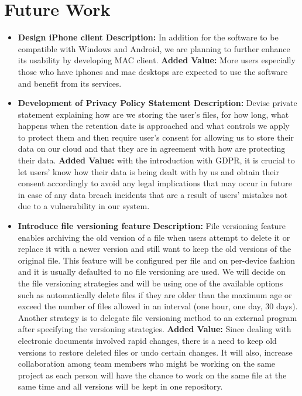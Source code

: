 \documentclass{article}
\begin{document}
\section{Future Work}
\begin{itemize}

\item \textbf{Design iPhone client}
\textbf{Description:} In addition for the software to be compatible with Windows and Android, we are planning to further enhance its usability by developing MAC client.
\textbf{Added Value:} More users especially those who have iphones and mac desktops are expected to use the software and benefit from its services.

\item \textbf{Development of Privacy Policy Statement}
\textbf{Description:} Devise private statement explaining how are we storing the user’s files, for how long, what happens when the retention date is approached and what controls we apply to protect them and then require user’s consent for allowing us to store their data on our cloud and that they are in agreement with how are protecting their data.
\textbf{Added Value:} with the introduction with GDPR, it is crucial to let users’ know how their data is being dealt with by us and obtain their consent accordingly to avoid any legal implications that may occur in future in case of any data breach incidents that are a result of users’ mistakes not due to a vulnerability in our system.


\item \textbf{Introduce file versioning feature}
\textbf{Description:} File versioning feature enables archiving the old version of a file when users attempt to delete it or replace it with a newer version and still want to keep the old versions of the original file. This feature will be configured per file and on per-device fashion and it is usually defaulted to no file versioning are used.
We will decide on the file versioning strategies and will be using one of the available options such as automatically delete files if they are older than the maximum age or exceed the number of files allowed in an interval (one hour, one day, 30 days). Another strategy is to delegate file versioning method to an external program after specifying the versioning strategies.
\textbf{Added Value:} Since dealing with electronic documents involved rapid changes, there is a need to keep old versions to restore deleted files or undo certain changes. It will also, increase collaboration among team members who might be working on the same project as each person will have the chance to work on the same file at the same time and all versions will be kept in one repository.



\end{itemize}
\end{document}
